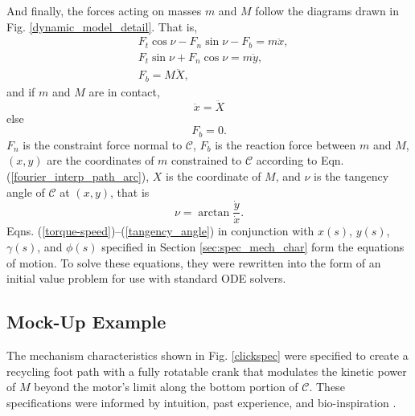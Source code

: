 \documentclass[journal]{IEEEtran}
\begin{document}
And finally, the forces acting on masses $m$ and $M$ follow the diagrams drawn in Fig. \ref{dynamic_model_detail}.
That is,
\begin{align}
&F_t\cos\nu - F_n\sin\nu - F_b = m\ddot{x}, \nonumber\\
&F_t\sin\nu + F_n\cos\nu = m\ddot{y}, \nonumber\\
&F_b = M\ddot{X},
\end{align}
and if $m$ and $M$ are in contact,
\begin{equation}
\ddot{x} = \ddot{X}
\end{equation}
else
\begin{equation}
F_b = 0.
\end{equation}
$F_n$ is the constraint force normal to $\mathcal{C}$, $F_b$ is the reaction force between $m$ and $M$, $(x,y)$ are the coordinates of $m$ constrained to $\mathcal{C}$ according to Eqn. (\ref{fourier_interp_path_arc}), $X$ is the coordinate of $M$, and $\nu$ is the tangency angle of $\mathcal{C}$ at $(x,y)$, that is
\begin{equation}
\nu = \arctan\frac{\dot{y}}{\dot{x}}.
\label{tangency_angle}
\end{equation}
Eqns. (\ref{torque-speed})--(\ref{tangency_angle}) in conjunction with $x(s)$, $y(s)$, $\gamma(s)$, and $\phi(s)$ specified in Section \ref{sec:spec_mech_char} form the equations of motion.  To solve these equations, they were rewritten into the form of an initial value problem for use with standard ODE solvers.



\subsection{Mock-Up Example}
\label{sec:mock_exam}

The mechanism characteristics shown in Fig. \ref{clickspec} were specified to create a recycling foot path with a fully rotatable crank that modulates the kinetic power of $M$ beyond the motor's limit along the bottom portion of $\mathcal{C}$.
These specifications were informed by intuition, past experience, and bio-inspiration \cite{haldaneRoboticVerticalJumping2016}.
\end{document}
